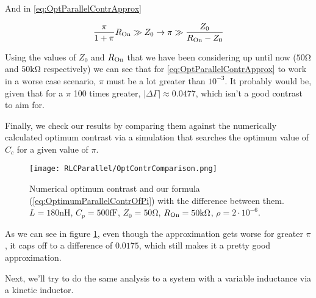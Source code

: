 \documentclass[../main.tex]{subfiles}
\begin{document}
And in \ref{eq:OptParallelContrApprox}

\begin{equation}
\label{eq:OptParallelContrApproxOfPi}
\frac{\pi}{1 + \pi}R_{\text{On}} \gg Z_{0} \rightarrow
\pi \gg \frac{Z_{0}}{R_{\text{On}} - Z_{0}}
\end{equation}

Using the values of \(Z_{0}\) and \(R_{\text{On}}\) that we have been considering
up until now (\(50\unit{\ohm}\) and \(50\unit{\kilo\ohm}\) respectively) we can
see that for \ref{eq:OptParallelContrApprox} to work in a worse case scenario,
\(\pi\) must be a lot greater than \(10^{-3}\). It probably would
be, given that for a \(\pi\) 100 times greater,
\(|\Delta\Gamma| \approx 0.0477\), which isn't a good contrast to
aim for.

Finally, we check our results by comparing them against the numerically
calculated optimum contrast via a simulation that searches the optimum
value of \(C_{c}\) for a given value of \(\pi\).

\begin{figure}[t]
\centering
  \texttt{[image: RLCParallel/OptContrComparison.png]}
  \caption{Numerical optimum contrast and our formula (\ref{eq:OptimumParallelContrOfPi})
  with the difference between them.
\(L = 180\unit{\nano\henry}\), \(C_{p} = 500\unit{\femto\farad}\),
\(Z_{0} = 50\unit{\ohm}\), \(\ROn = 50\unit{\kilo\ohm}\),
\(\rho = 2\cdot10^{-6}\).}
\label{fig:ParallelContrComparison}
\end{figure}

As we can see in figure \ref{fig:ParallelContrComparison}, even though
the approximation gets worse for greater \(\pi\), it caps off to a difference of
\(0.0175\), which still makes it a pretty good approximation.

Next, we'll try to do the same analysis to a system with a variable inductance
via a kinetic inductor.
\end{document}
